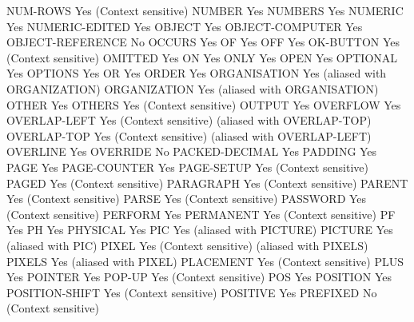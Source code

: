 NUM-ROWS                        Yes (Context sensitive)
NUMBER                          Yes
NUMBERS                         Yes
NUMERIC                         Yes
NUMERIC-EDITED                  Yes
OBJECT                          Yes
OBJECT-COMPUTER                 Yes
OBJECT-REFERENCE                No
OCCURS                          Yes
OF                              Yes
OFF                             Yes
OK-BUTTON                       Yes (Context sensitive)
OMITTED                         Yes
ON                              Yes
ONLY                            Yes
OPEN                            Yes
OPTIONAL                        Yes
OPTIONS                         Yes
OR                              Yes
ORDER                           Yes
ORGANISATION                    Yes (aliased with ORGANIZATION)
ORGANIZATION                    Yes (aliased with ORGANISATION)
OTHER                           Yes
OTHERS                          Yes (Context sensitive)
OUTPUT                          Yes
OVERFLOW                        Yes
OVERLAP-LEFT                    Yes (Context sensitive) (aliased with OVERLAP-TOP)
OVERLAP-TOP                     Yes (Context sensitive) (aliased with OVERLAP-LEFT)
OVERLINE                        Yes
OVERRIDE                        No
PACKED-DECIMAL                  Yes
PADDING                         Yes
PAGE                            Yes
PAGE-COUNTER                    Yes
PAGE-SETUP                      Yes (Context sensitive)
PAGED                           Yes (Context sensitive)
PARAGRAPH                       Yes (Context sensitive)
PARENT                          Yes (Context sensitive)
PARSE                           Yes (Context sensitive)
PASSWORD                        Yes (Context sensitive)
PERFORM                         Yes
PERMANENT                       Yes (Context sensitive)
PF                              Yes
PH                              Yes
PHYSICAL                        Yes
PIC                             Yes (aliased with PICTURE)
PICTURE                         Yes (aliased with PIC)
PIXEL                           Yes (Context sensitive) (aliased with PIXELS)
PIXELS                          Yes (aliased with PIXEL)
PLACEMENT                       Yes (Context sensitive)
PLUS                            Yes
POINTER                         Yes
POP-UP                          Yes (Context sensitive)
POS                             Yes
POSITION                        Yes
POSITION-SHIFT                  Yes (Context sensitive)
POSITIVE                        Yes
PREFIXED                        No (Context sensitive)
